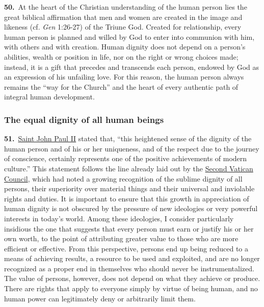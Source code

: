 \documentclass{article}
\begin{document}
\textbf{50.}\ At the heart of the Christian understanding of the human person lies the great biblical affirmation that men and women are created in the image and likeness (cf. \emph{Gen} 1:26-27) of the Triune God. Created for relationship, every human person is planned and willed by God to enter into communion with him, with others and with creation. Human dignity does not depend on a person's abilities, wealth or position in life, nor on the right or wrong choices made; instead, it is a gift that precedes and transcends each person, endowed by God as an expression of his unfailing love. For this reason, the human person always remains the ``way for the Church''\cite{n55} and the heart of every authentic path of integral human development.\cite{n56}

\subsubsection{The equal dignity of all human beings}

\textbf{51.}\ \href{https://www.vatican.va/content/john-paul-ii/en.html}{Saint John Paul II} stated that, ``this heightened sense of the dignity of the human person and of his or her uniqueness, and of the respect due to the journey of conscience, certainly represents one of the positive achievements of modern culture.''\cite{n57} This statement follows the line already laid out by the \href{https://www.vatican.va/archive/hist_councils/ii_vatican_council/index.htm}{Second Vatican Council}, which had noted a growing recognition of the sublime dignity of all persons, their superiority over material things and their universal and inviolable rights and duties.\cite{n58} It is important to ensure that this growth in appreciation of human dignity is not obscured by the pressure of new ideologies or very powerful interests in today's world. Among these ideologies, I consider particularly insidious the one that suggests that every person must earn or justify his or her own worth, to the point of attributing greater value to those who are more efficient or effective. From this perspective, persons end up being reduced to a means of achieving results, a resource to be used and exploited, and are no longer recognized as a proper end in themselves who should never be instrumentalized. The value of persons, however, does not depend on what they achieve or produce. There are rights that apply to everyone simply by virtue of being human, and no human power can legitimately deny or arbitrarily limit them.\cite{n59}
\end{document}
